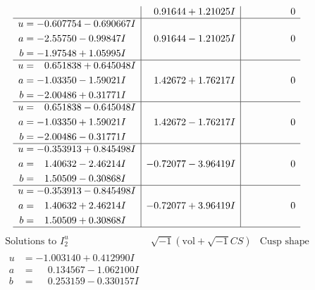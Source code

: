 \documentclass[1p]{elsarticle_modified}
\theoremstyle{definition}
\newcommand{\I}{\sqrt{-1}}
\begin{document}
$$\begin{array}{c|c|c}
 & \phantom{-}0.91644 + 1.21025 I & \phantom{-0.000000 } 0 \\ \hline\begin{aligned}
u &= -0.607754 - 0.690667 I \\
a &= -2.55750 - 0.99847 I \\
b &= -1.97548 + 1.05995 I\end{aligned}
 & \phantom{-}0.91644 - 1.21025 I & \phantom{-0.000000 } 0 \\ \hline\begin{aligned}
u &= \phantom{-}0.651838 + 0.645048 I \\
a &= -1.03350 - 1.59021 I \\
b &= -2.00486 + 0.31771 I\end{aligned}
 & \phantom{-}1.42672 + 1.76217 I & \phantom{-0.000000 } 0 \\ \hline\begin{aligned}
u &= \phantom{-}0.651838 - 0.645048 I \\
a &= -1.03350 + 1.59021 I \\
b &= -2.00486 - 0.31771 I\end{aligned}
 & \phantom{-}1.42672 - 1.76217 I & \phantom{-0.000000 } 0 \\ \hline\begin{aligned}
u &= -0.353913 + 0.845498 I \\
a &= \phantom{-}1.40632 - 2.46214 I \\
b &= \phantom{-}1.50509 - 0.30868 I\end{aligned}
 & -0.72077 - 3.96419 I & \phantom{-0.000000 } 0 \\ \hline\begin{aligned}
u &= -0.353913 - 0.845498 I \\
a &= \phantom{-}1.40632 + 2.46214 I \\
b &= \phantom{-}1.50509 + 0.30868 I\end{aligned}
 & -0.72077 + 3.96419 I & \phantom{-0.000000 } 0\\
 \hline 
 \end{array}$$\newpage$$\begin{array}{c|c|c}  
\text{Solutions to }I^u_{2}& \I (\text{vol} + \sqrt{-1}CS) & \text{Cusp shape}\\
 \hline 
\begin{aligned}
u &= -1.003140 + 0.412990 I \\
a &= \phantom{-}0.134567 - 1.062100 I \\
b &= \phantom{-}0.253159 - 0.330157 I\end{aligned}

\end{array}$$
\end{document}

